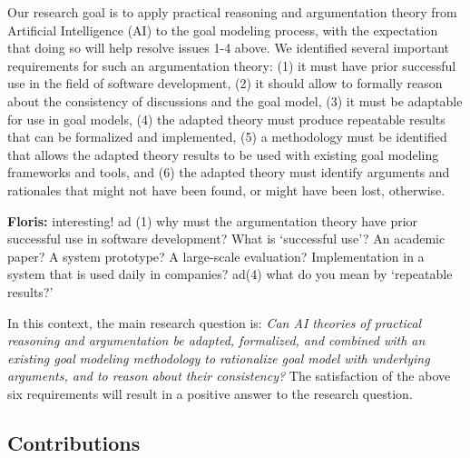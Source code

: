\documentclass[11.5pt,two column]{llncs}
\newcommand{\floris}[1]{{\color{red}\textbf{Floris: }#1}}
\begin{document}
Our research goal is to apply practical reasoning and argumentation theory from Artificial Intelligence (AI) to the goal modeling process, with the expectation that doing so will help resolve issues 1-4 above. We identified several important requirements for such an argumentation theory: (1) it must have prior successful use in the field of software development, (2) it should allow to formally reason about the consistency of discussions and the goal model, (3) it must be adaptable for use in goal models, (4) the adapted theory must produce repeatable results that can be formalized and implemented, (5) a methodology must be identified that allows the adapted theory results to be used with existing goal modeling frameworks and tools, and (6) the adapted theory must identify arguments and rationales that might not have been found, or might have been lost, otherwise.

\floris{interesting! ad (1) why must the argumentation theory have prior successful use in software development? What is `successful use'? An academic paper? A system prototype? A large-scale evaluation? Implementation in a system that is used daily in companies? ad(4) what do you mean by `repeatable results?'}

In this context, the main research question is: \emph{Can AI theories of practical reasoning and argumentation be adapted, formalized, and combined with an existing goal modeling methodology to rationalize goal model with underlying arguments, and to reason about their consistency?} The satisfaction of the above six requirements will result in a positive answer to the research question. %

\subsection{Contributions} %
\end{document}
